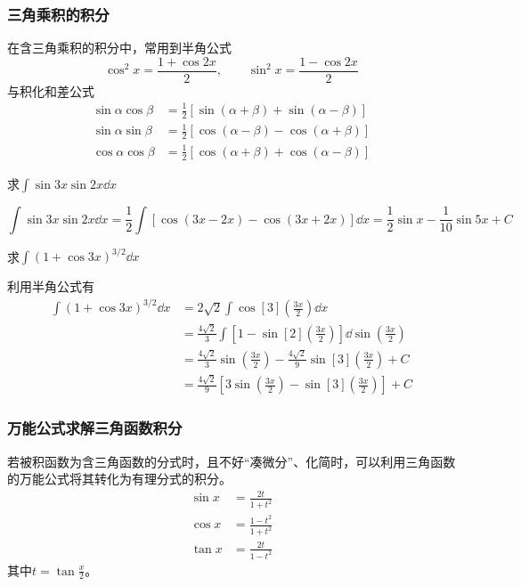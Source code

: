 \subsubsection{三角乘积的积分}
在含三角乘积的积分中，常用到半角公式
\[ \cos^2x = \frac{1+\cos 2x}{2}, \qquad \sin^2 x = \frac{1-\cos 2x}{2} \]
与积化和差公式
\begin{align*}
    \sin\alpha\cos\beta & = \frac{1}{2}[\sin(\alpha+\beta)+\sin(\alpha-\beta)] \\
    \sin\alpha\sin\beta & = \frac{1}{2}[\cos(\alpha-\beta)-\cos(\alpha+\beta)] \\
    \cos\alpha\cos\beta & = \frac{1}{2}[\cos(\alpha+\beta)+\cos(\alpha-\beta)]
\end{align*}

\begin{example}
    求$\displaystyle \int\sin 3x\sin 2x\dd{x}$
\end{example}
\begin{solution}
    \[
        \int\sin 3x\sin 2x\dd{x}
        =
        \frac{1}{2}\int [\cos(3x-2x) - \cos(3x+2x)] \dd{x}
        =
        \frac{1}{2}\sin x - \frac{1}{10}\sin 5x + C
    \]
\end{solution}
\begin{example}
    求$\displaystyle \int(1+\cos 3x)^{3/2}\dd{x}$
\end{example}
\begin{solution}
    利用半角公式有
    \begin{align*}
        \int(1+\cos 3x)^{3/2}\dd{x} & = 2\sqrt{2}\int \cos[3](\frac{3x}{2})\dd{x}                                            \\
                                    & = \frac{4\sqrt{2}}{3}\int \left[1-\sin[2](\frac{3x}{2})\right]\dd{\sin(\frac{3x}{2})}  \\
                                    & = \frac{4\sqrt{2}}{3}\sin(\frac{3x}{2}) - \frac{4\sqrt{2}}{9}\sin[3](\frac{3x}{2}) + C \\
                                    & = \frac{4\sqrt{2}}{9}\left[3\sin(\frac{3x}{2})-\sin[3](\frac{3x}{2})\right] + C
    \end{align*}
\end{solution}

\subsubsection{万能公式求解三角函数积分}
若被积函数为含三角函数的分式时，且不好“凑微分”、化简时，可以利用三角函数的万能公式将其转化为有理分式的积分。
\begin{align}
    \label{eq:万能公式}
    \sin x & = \frac{2t}{1+t^2}    \\
    \cos x & = \frac{1-t^2}{1+t^2} \\
    \tan x & = \frac{2t}{1-t^2}
\end{align}
其中$t=\tan \frac{x}{2}$。

